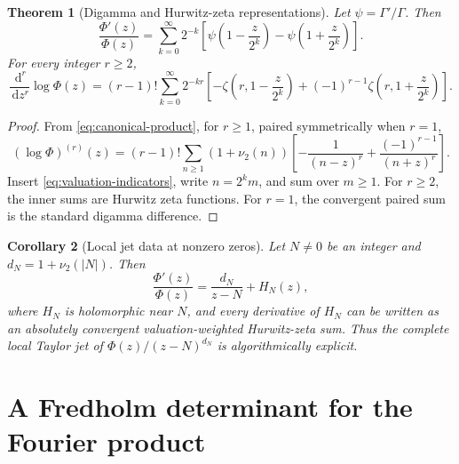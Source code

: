 \documentclass[11pt]{article}
\newtheorem{theorem}{Theorem}[section]
\newtheorem{corollary}[theorem]{Corollary}
\theoremstyle{definition}
\theoremstyle{remark}
\newcommand{\dd}{\,\mathrm d}
\begin{document}
\begin{theorem}[Digamma and Hurwitz-zeta representations]\label{thm:hurwitz}
Let \(\psi=\Gamma'/\Gamma\).  Then
\begin{equation}
 \boxed{
 \frac{\Phi'(z)}{\Phi(z)}
 =\sum_{k=0}^{\infty}2^{-k}
 \left[
 \psi\!\left(1-\frac{z}{2^k}\right)
 -\psi\!\left(1+\frac{z}{2^k}\right)
 \right].
 }                                                           \label{eq:logder-digamma}
\end{equation}
For every integer \(r\ge2\),
\begin{equation}
 \boxed{
 \frac{\dd^r}{\dd z^r}\log\Phi(z)
 =(r-1)!\sum_{k=0}^{\infty}2^{-kr}
 \left[
 -\zeta\!\left(r,1-\frac{z}{2^k}\right)
 +(-1)^{r-1}\zeta\!\left(r,1+\frac{z}{2^k}\right)
 \right].
 }                                                           \label{eq:logder-hurwitz}
\end{equation}
\end{theorem}

\begin{proof}
From \eqref{eq:canonical-product}, for \(r\ge1\), paired symmetrically when \(r=1\),
\begin{equation}
 (\log\Phi)^{(r)}(z)
 =(r-1)!\sum_{n\ge1}(1+\nu_2(n))
 \left[-\frac1{(n-z)^r}+\frac{(-1)^{r-1}}{(n+z)^r}\right].   \label{eq:logder-general-zero}
\end{equation}
Insert \eqref{eq:valuation-indicators}, write \(n=2^k m\), and sum over \(m\ge1\).
For \(r\ge2\), the inner sums are Hurwitz zeta functions.  For \(r=1\), the convergent
paired sum is the standard digamma difference.
\end{proof}

\begin{corollary}[Local jet data at nonzero zeros]
Let \(N\ne0\) be an integer and \(d_N=1+\nu_2(|N|)\).  Then
\begin{equation}
 \frac{\Phi'(z)}{\Phi(z)}=\frac{d_N}{z-N}+H_N(z),             \label{eq:local-logder-zero}
\end{equation}
where \(H_N\) is holomorphic near \(N\), and every derivative of \(H_N\) can be written
as an absolutely convergent valuation-weighted Hurwitz-zeta sum.  Thus the complete local
Taylor jet of \(\Phi(z)/(z-N)^{d_N}\) is algorithmically explicit.
\end{corollary}

\section{A Fredholm determinant for the Fourier product}\label{sec:fredholm}
\end{document}
